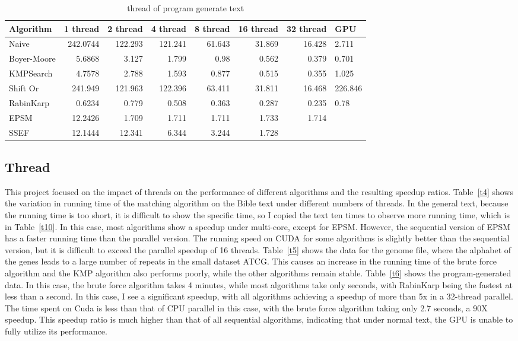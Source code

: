 \documentclass[11pt]{article}       %
\begin{document}
\begin{table}[htbp]
  \centering
  \caption{thread of program generate text}
    \begin{tabular}{lrrrrrr}\label{t6}
Algorithm & 1 thread & 2 thread & 4 thread & 8 thread & 16 thread & 32 thread & GPU \\
 \hline
    Naive & 242.0744 & 122.293 & 121.241 & 61.643 & 31.869 & 16.428 & 2.711 \\
    Boyer-Moore & 5.6868 & 3.127 & 1.799 & 0.98  & 0.562 & 0.379 & 0.701 \\
    KMPSearch & 4.7578 & 2.788 & 1.593 & 0.877 & 0.515 & 0.355 & 1.025 \\
    Shift Or & 241.949 & 121.963 & 122.396 & 63.411 & 31.811 & 16.468 & 226.846 \\
    RabinKarp & 0.6234 & 0.779 & 0.508 & 0.363 & 0.287 & 0.235 & 0.78 \\
    EPSM  & 12.2426 & 1.709 & 1.711 & 1.711 & 1.733 & 1.714 &  \\
    SSEF  & 12.1444 & 12.341 & 6.344 & 3.244 & 1.728 &       &  \\
    \end{tabular}%
  \label{tab:addlabel}%
\end{table}%

\subsection{Thread}\label{tf}


This project focused on the impact of threads on the performance of different algorithms and the resulting speedup ratios. Table~\ref{t4} shows the variation in running time of the matching algorithm on the Bible text under different numbers of threads. In the general text, because the running time is too short, it is difficult to show the specific time, so I copied the text ten times to observe more running time, which is in Table~\ref{t10}. In this case, most algorithms show a speedup under multi-core, except for EPSM. However, the sequential version of EPSM has a faster running time than the parallel version. The running speed on CUDA for some algorithms is slightly better than the sequential version, but it is difficult to exceed the parallel speedup of 16 threads. Table~\ref{t5} shows the data for the genome file, where the alphabet of the genes leads to a large number of repeats in the small dataset {ATCG}. This causes an increase in the running time of the brute force algorithm and the KMP algorithm also performs poorly, while the other algorithms remain stable. Table~\ref{t6} shows the program-generated data. In this case, the brute force algorithm takes 4 minutes, while most algorithms take only seconds, with RabinKarp being the fastest at less than a second. In this case, I see a significant speedup, with all algorithms achieving a speedup of more than 5x in a 32-thread parallel. The time spent on Cuda is less than that of CPU parallel in this case, with the brute force algorithm taking only 2.7 seconds, a 90X speedup. This speedup ratio is much higher than that of all sequential algorithms, indicating that under normal text, the GPU is unable to fully utilize its performance.
\end{document}
